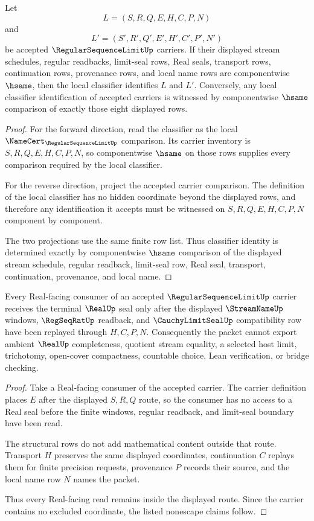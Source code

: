 \begin{theorem}
\label{thm:regular-sequence-limit-classifier-determinacy}
Let
$$
L=(S,R,Q,E,H,C,P,N)
$$
and
$$
L'=(S',R',Q',E',H',C',P',N')
$$
be accepted $\RegularSequenceLimitUp$ carriers. If their displayed stream schedules, regular readbacks, limit-seal rows, Real seals, transport rows, continuation rows, provenance rows, and local name rows are componentwise $\hsame$, then the local classifier identifies $L$ and $L'$. Conversely, any local classifier identification of accepted carriers is witnessed by componentwise $\hsame$ comparison of exactly those eight displayed rows.
\end{theorem}
\begin{proof}
For the forward direction, read the classifier as the local $\NameCert_{\RegularSequenceLimitUp}$ comparison. Its carrier inventory is $S,R,Q,E,H,C,P,N$, so componentwise $\hsame$ on those rows supplies every comparison required by the local classifier.

For the reverse direction, project the accepted carrier comparison. The definition of the local classifier has no hidden coordinate beyond the displayed rows, and therefore any identification it accepts must be witnessed on $S,R,Q,E,H,C,P,N$ component by component.

The two projections use the same finite row list. Thus classifier identity is determined exactly by componentwise $\hsame$ comparison of the displayed stream schedule, regular readback, limit-seal row, Real seal, transport, continuation, provenance, and local name.
\end{proof}

\begin{theorem}
\label{thm:regular-sequence-limit-real-nonescape}
Every Real-facing consumer of an accepted $\RegularSequenceLimitUp$ carrier receives the terminal $\RealUp$ seal only after the displayed $\StreamNameUp$ windows, $\RegSeqRatUp$ readback, and $\CauchyLimitSealUp$ compatibility row have been replayed through $H,C,P,N$. Consequently the packet cannot export ambient $\RealUp$ completeness, quotient stream equality, a selected host limit, trichotomy, open-cover compactness, countable choice, Lean verification, or bridge checking.
\end{theorem}
\begin{proof}
Take a Real-facing consumer of the accepted carrier. The carrier definition places $E$ after the displayed $S,R,Q$ route, so the consumer has no access to a Real seal before the finite windows, regular readback, and limit-seal boundary have been read.

The structural rows do not add mathematical content outside that route. Transport $H$ preserves the same displayed coordinates, continuation $C$ replays them for finite precision requests, provenance $P$ records their source, and the local name row $N$ names the packet.

Thus every Real-facing read remains inside the displayed route. Since the carrier contains no excluded coordinate, the listed nonescape claims follow.
\end{proof}

